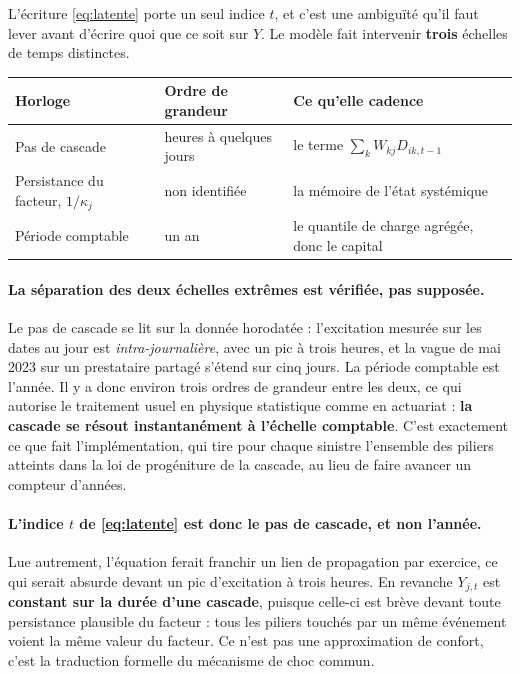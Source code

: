 \documentclass[11pt,a4paper]{article}
\begin{document}
L'écriture \eqref{eq:latente} porte un seul indice $t$, et c'est une ambiguïté qu'il faut
lever avant d'écrire quoi que ce soit sur $Y$. Le modèle fait intervenir \textbf{trois}
échelles de temps distinctes.

\begin{center}\small
\renewcommand{\arraystretch}{1.3}
\begin{tabular}{@{}l l l@{}}
\toprule
\textbf{Horloge} & \textbf{Ordre de grandeur} & \textbf{Ce qu'elle cadence} \\
\midrule
Pas de cascade & heures à quelques jours & le terme $\sum_k W_{kj} D_{ik,t-1}$ \\
Persistance du facteur, $1/\kappa_j$ & non identifiée & la mémoire de l'état systémique \\
Période comptable & un an & le quantile de charge agrégée, donc le capital \\
\bottomrule
\end{tabular}
\end{center}

\paragraph{La séparation des deux échelles extrêmes est vérifiée, pas supposée.} Le pas de
cascade se lit sur la donnée horodatée : l'excitation mesurée sur les dates au jour est
\emph{intra-journalière}, avec un pic à trois heures, et la vague de mai 2023 sur un
prestataire partagé s'étend sur cinq jours. La période comptable est l'année. Il y a donc
environ trois ordres de grandeur entre les deux, ce qui autorise le traitement usuel en
physique statistique comme en actuariat : \textbf{la cascade se résout instantanément à
l'échelle comptable}. C'est exactement ce que fait l'implémentation, qui tire pour chaque
sinistre l'ensemble des piliers atteints dans la loi de progéniture de la cascade, au lieu
de faire avancer un compteur d'années.

\paragraph{L'indice $t$ de \eqref{eq:latente} est donc le pas de cascade, et non l'année.}
Lue autrement, l'équation ferait franchir un lien de propagation par exercice, ce qui serait
absurde devant un pic d'excitation à trois heures. En revanche $Y_{j,t}$ est
\textbf{constant sur la durée d'une cascade}, puisque celle-ci est brève devant toute
persistance plausible du facteur : tous les piliers touchés par un même événement voient
la même valeur du facteur. Ce n'est pas une approximation de confort, c'est la traduction
formelle du mécanisme de choc commun.
\end{document}
